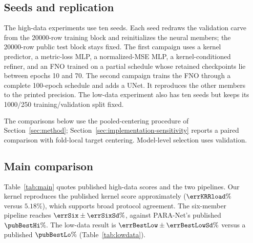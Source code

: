 \subsection{Seeds and replication}
\label{sec:seeds}
The high-data experiments use ten seeds. Each seed redraws the validation carve from the 20000-row training block and reinitializes the neural members; the 20000-row public test block stays fixed. The first campaign uses a kernel predictor, a metric-loss MLP, a normalized-MSE MLP, a kernel-conditioned refiner, and an FNO trained on a partial schedule whose retained checkpoints lie between epochs 10 and 70. The second campaign trains the FNO through a complete 100-epoch schedule and adds a UNet. It reproduces the other members to the printed precision. The low-data experiment also has ten seeds but keeps its 1000/250 training/validation split fixed.

The comparisons below use the pooled-centering procedure of Section~\ref{sec:method}; Section~\ref{sec:implementation-sensitivity} reports a paired comparison with fold-local target centering. Model-level selection uses validation.

\subsection{Main comparison}
Table~\ref{tab:main} quotes published high-data scores and the two pipelines. Our kernel reproduces the published kernel score approximately ($\errKRRload\%$ versus $5.18\%$), which supports broad protocol agreement. The six-member pipeline reaches $\errSix\pm\errSixSd\%$, against PARA-Net's published $\pubBestHi\%$. The low-data result is $\errBestLow\pm\errBestLowSd\%$ versus a published $\pubBestLo\%$ (Table~\ref{tab:lowdata}).

